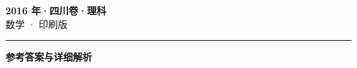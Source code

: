 \documentclass[zihao=5, a4paper]{ctexart}
\begin{document}
\begin{center}
  {\Large\bfseries 2016 年·四川卷·理科}\\[4pt]
  {\large 数学 · 印刷版}
\end{center}
\medskip
{}

\par\bigskip\hrule\bigskip
{}
\begin{center}{\large\bfseries 参考答案与详细解析}\end{center}
\smallskip

\end{document}
